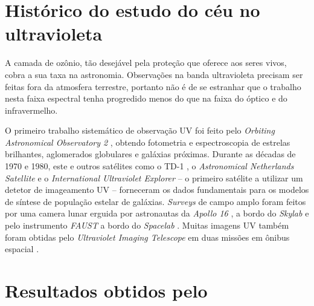 
\section{Histórico do estudo do céu no ultravioleta}
\label{sec:Galex:CeuUV}

A camada de ozônio, tão desejável pela proteção que oferece aos seres vivos,
cobra a sua taxa na astronomia. Observações na banda ultravioleta precisam ser
feitas fora da atmosfera terrestre, portanto não é de se estranhar que o
trabalho nesta faixa espectral tenha progredido menos do que na faixa do óptico
e do infravermelho.\citneed

O primeiro trabalho sistemático de observação UV foi feito pelo {\em Orbiting
Astronomical Observatory 2} \citep{Code1970}, obtendo fotometria e
espectroscopia de estrelas brilhantes, aglomerados globulares e galáxias
próximas. Durante as décadas de 1970 e 1980, este e outros satélites como o TD-1
\citep{Boksenberg1973}, o {\em Astronomical Netherlands Satellite}
\citep{vanDuinen1975} e o {\em International Ultraviolet Explorer}
\citep{Kondo1987} -- o primeiro satélite a utilizar um detetor de imageamento UV
-- forneceram os dados fundamentais para os modelos de síntese de população
estelar de galáxias. {\em Surveys} de campo amplo foram feitos por uma camera
lunar erguida por astronautas da {\em Apollo 16} \citep{Carruthers1973}, a bordo
do {\em Skylab} \citep{Henize1975} e pelo instrumento {\em FAUST} a bordo do
{\em Spacelab} \citep{Bowyer1993}. Muitas imagens UV também foram obtidas pelo
{\em Ultraviolet Imaging Telescope} em duas missões em ônibus espacial
\citep{Stecher1997}.



\section{Resultados obtidos pelo \galex}
\label{sec:Galex:Resultados}

